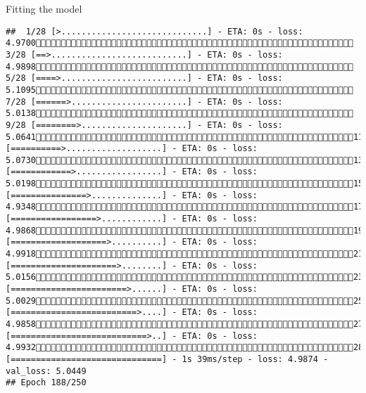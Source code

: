 \documentclass[
  ignorenonframetext,
]{beamer}
\begin{document}
\begin{frame}[fragile]{Fitting the model}
\begin{verbatim}
##  1/28 [>.............................] - ETA: 0s - loss: 4.9700 3/28 [==>...........................] - ETA: 0s - loss: 4.9898 5/28 [====>.........................] - ETA: 0s - loss: 5.1095 7/28 [======>.......................] - ETA: 0s - loss: 5.0138 9/28 [========>.....................] - ETA: 0s - loss: 5.064111/28 [==========>...................] - ETA: 0s - loss: 5.073013/28 [============>.................] - ETA: 0s - loss: 5.019815/28 [===============>..............] - ETA: 0s - loss: 4.934817/28 [=================>............] - ETA: 0s - loss: 4.986819/28 [===================>..........] - ETA: 0s - loss: 4.991821/28 [=====================>........] - ETA: 0s - loss: 5.015623/28 [=======================>......] - ETA: 0s - loss: 5.002925/28 [=========================>....] - ETA: 0s - loss: 4.985827/28 [===========================>..] - ETA: 0s - loss: 4.993228/28 [==============================] - 1s 39ms/step - loss: 4.9874 - val_loss: 5.0449
## Epoch 188/250

\end{verbatim}
\end{frame}
\end{document}
